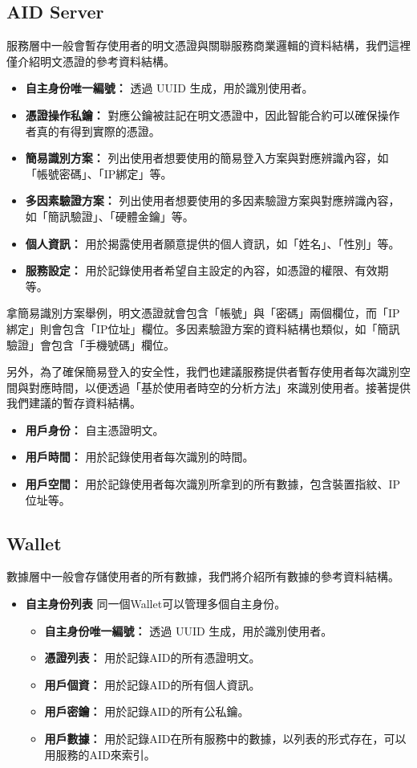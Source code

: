 \subsection{AID Server}
服務層中一般會暫存使用者的明文憑證與關聯服務商業邏輯的資料結構，我們這裡僅介紹明文憑證的參考資料結構。
\begin{itemize}
  \item \textbf{自主身份唯一編號：} 透過 UUID 生成，用於識別使用者。
  \item \textbf{憑證操作私鑰：} 對應公鑰被註記在明文憑證中，因此智能合約可以確保操作者真的有得到實際的憑證。
  \item \textbf{簡易識別方案：} 列出使用者想要使用的簡易登入方案與對應辨識內容，如「帳號密碼」、「IP綁定」等。
  \item \textbf{多因素驗證方案：} 列出使用者想要使用的多因素驗證方案與對應辨識內容，如「簡訊驗證」、「硬體金鑰」等。
  \item \textbf{個人資訊：} 用於揭露使用者願意提供的個人資訊，如「姓名」、「性別」等。
  \item \textbf{服務設定：} 用於記錄使用者希望自主設定的內容，如憑證的權限、有效期等。
\end{itemize}
拿簡易識別方案舉例，明文憑證就會包含「帳號」與「密碼」兩個欄位，而「IP綁定」則會包含「IP位址」欄位。多因素驗證方案的資料結構也類似，如「簡訊驗證」會包含「手機號碼」欄位。

另外，為了確保簡易登入的安全性，我們也建議服務提供者暫存使用者每次識別空間與對應時間，以便透過「基於使用者時空的分析方法」來識別使用者。接著提供我們建議的暫存資料結構。
\begin{itemize}
  \item \textbf{用戶身份：} 自主憑證明文。
  \item \textbf{用戶時間：} 用於記錄使用者每次識別的時間。
  \item \textbf{用戶空間：} 用於記錄使用者每次識別所拿到的所有數據，包含裝置指紋、IP位址等。
\end{itemize}
\subsection{Wallet}
數據層中一般會存儲使用者的所有數據，我們將介紹所有數據的參考資料結構。
\begin{itemize}
  \item \textbf{自主身份列表} 同一個Wallet可以管理多個自主身份。
        \begin{itemize}
          \item \textbf{自主身份唯一編號：} 透過 UUID 生成，用於識別使用者。
          \item \textbf{憑證列表：} 用於記錄AID的所有憑證明文。
          \item \textbf{用戶個資：} 用於記錄AID的所有個人資訊。
          \item \textbf{用戶密鑰：} 用於記錄AID的所有公私鑰。
          \item \textbf{用戶數據：} 用於記錄AID在所有服務中的數據，以列表的形式存在，可以用服務的AID來索引。
        \end{itemize}
\end{itemize}
